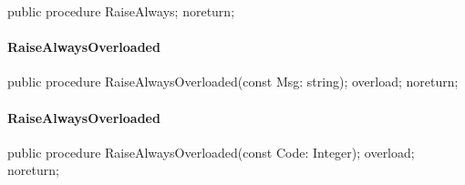 \documentclass{report}
\begin{document}
\begin{list}{}{
\setlength{\itemindent}{0cm}
\setlength{\listparindent}{0cm}
\setlength{\leftmargin}{\evensidemargin}
\addtolength{\leftmargin}{\tmplength}
\settowidth{\labelsep}{X}
\addtolength{\leftmargin}{\labelsep}
\setlength{\labelwidth}{\tmplength}
}
\begin{flushleft}
\item[\textbf{Declaration}\hfill]
\begin{ttfamily}
public procedure RaiseAlways; noreturn;\end{ttfamily}


\end{flushleft}
\end{list}
\paragraph*{RaiseAlwaysOverloaded}\hspace*{\fill}

\begin{list}{}{
\setlength{\itemindent}{0cm}
\setlength{\listparindent}{0cm}
\setlength{\leftmargin}{\evensidemargin}
\addtolength{\leftmargin}{\tmplength}
\settowidth{\labelsep}{X}
\addtolength{\leftmargin}{\labelsep}
\setlength{\labelwidth}{\tmplength}
}
\begin{flushleft}
\item[\textbf{Declaration}\hfill]
\begin{ttfamily}
public procedure RaiseAlwaysOverloaded(const Msg: string); overload; noreturn;\end{ttfamily}


\end{flushleft}
\end{list}
\paragraph*{RaiseAlwaysOverloaded}\hspace*{\fill}

\begin{list}{}{
\setlength{\itemindent}{0cm}
\setlength{\listparindent}{0cm}
\setlength{\leftmargin}{\evensidemargin}
\addtolength{\leftmargin}{\tmplength}
\settowidth{\labelsep}{X}
\addtolength{\leftmargin}{\labelsep}
\setlength{\labelwidth}{\tmplength}
}
\begin{flushleft}
\item[\textbf{Declaration}\hfill]
\begin{ttfamily}
public procedure RaiseAlwaysOverloaded(const Code: Integer); overload; noreturn;\end{ttfamily}


\end{flushleft}
\end{list}
\end{document}
